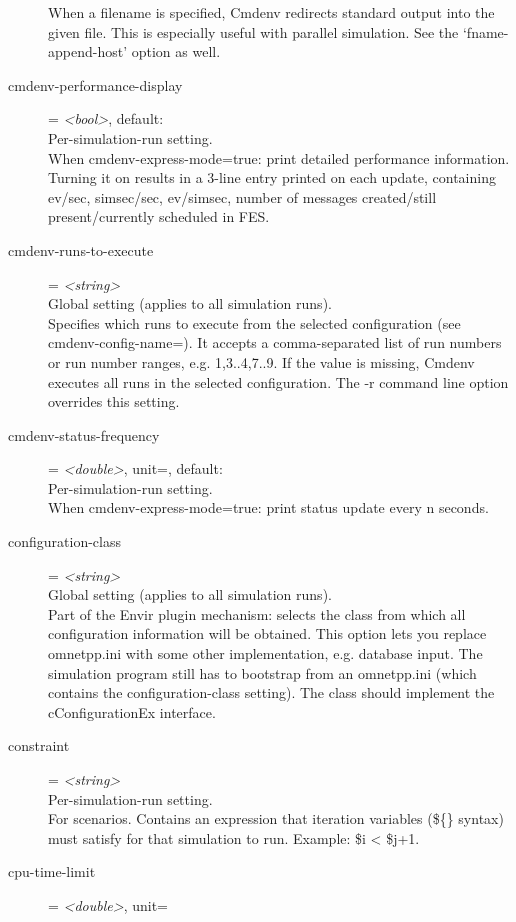\begin{description}
    When a filename is specified, Cmdenv redirects standard output into the
    given file. This is especially useful with parallel simulation. See the
    `fname-append-host' option as well.
\item[cmdenv-performance-display] = \textit{<bool>}, default: \\
    Per-simulation-run setting.\\
    When cmdenv-express-mode=true: print detailed performance information.
    Turning it on results in a 3-line entry printed on each update, containing
    ev/sec, simsec/sec, ev/simsec, number of messages created/still
    present/currently scheduled in FES.
\item[cmdenv-runs-to-execute] = \textit{<string>}\\
    Global setting (applies to all simulation runs).\\
    Specifies which runs to execute from the selected configuration (see
    cmdenv-config-name=). It accepts a comma-separated list of run numbers or
    run number ranges, e.g. 1,3..4,7..9. If the value is missing, Cmdenv
    executes all runs in the selected configuration. The -r command line option
    overrides this setting.
\item[cmdenv-status-frequency] = \textit{<double>}, unit=, default: \\
    Per-simulation-run setting.\\
    When cmdenv-express-mode=true: print status update every n seconds.
\item[configuration-class] = \textit{<string>}\\
    Global setting (applies to all simulation runs).\\
    Part of the Envir plugin mechanism: selects the class from which all
    configuration information will be obtained. This option lets you replace
    omnetpp.ini with some other implementation, e.g. database input. The
    simulation program still has to bootstrap from an omnetpp.ini (which
    contains the configuration-class setting). The class should implement the
    cConfigurationEx interface.
\item[constraint] = \textit{<string>}\\
    Per-simulation-run setting.\\
    For scenarios. Contains an expression that iteration variables (\$\{\}
    syntax) must satisfy for that simulation to run. Example: \$i < \$j+1.
\item[cpu-time-limit] = \textit{<double>}, unit=\\

\end{description}
